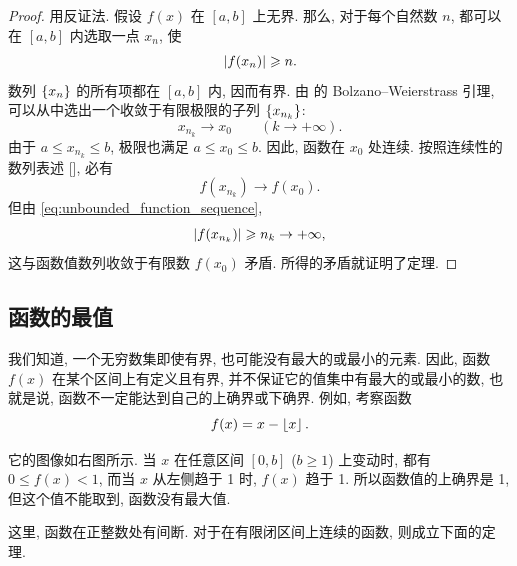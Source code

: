 \begin{proof}
用反证法. 假设 $f(x)$ 在 $[a,b]$ 上无界.
那么, 对于每个自然数 $n$, 都可以在 $[a,b]$ 内选取一点 $x_n$, 使
\begin{equation}\label{eq:unbounded_function_sequence}
\left| f(x_n) \right|\geqslant n.
\end{equation}
数列 $\{x_{n}\}$ 的所有项都在 $[a,b]$ 内, 因而有界.
由  的 Bolzano--Weierstrass 引理,
可以从中选出一个收敛于有限极限的子列 $\left\{ x_{n_k} \right\}$:
$$
x_{n_k}\to x_0\qquad(k\to+\infty).
$$
由于 $a\leq x_{n_k}\leq b$, 极限也满足 $a\leq x_0\leq b$.
因此, 函数在 $x_0$ 处连续.
按照连续性的数列表述 [], 必有
$$
f(x_{n_k})\to f(x_0).
$$
但由 \eqref{eq:unbounded_function_sequence},
$$
\left| f(x_{n_k}) \right|\geqslant n_k\to+\infty,
$$
这与函数值数列收敛于有限数 $f(x_0)$ 矛盾.
所得的矛盾就证明了定理.
\end{proof}

\subsection{函数的最值}\label{subsec:85}
我们知道, 一个无穷数集即使有界, 也可能没有最大的或最小的元素.
因此, 函数 $f(x)$ 在某个区间上有定义且有界,
并不保证它的值集中有最大的或最小的数,
也就是说, 函数不一定能达到自己的上确界或下确界.
例如, 考察函数
$$
f(x)=x-\left\lfloor x \right\rfloor.
$$
\begin{figure}
    \vspace{-0.5cm}
    \centering
\end{figure}
它的图像如右图所示.
当 $x$ 在任意区间 $[0,b]$ ($b\geq1$) 上变动时,
都有 $0\leq f(x)<1$, 而当 $x$ 从左侧趋于 1 时, $f(x)$ 趋于 1.
所以函数值的上确界是 1, 但这个值不能取到, 函数没有最大值.

这里, 函数在正整数处有间断.
对于在有限闭区间上连续的函数, 则成立下面的定理.

